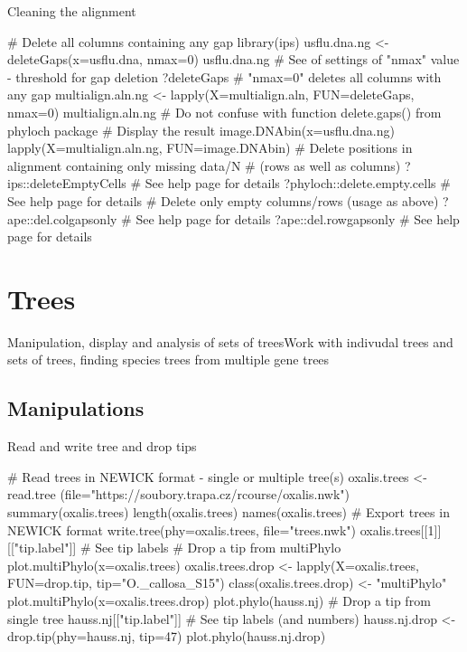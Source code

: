 \documentclass[compress, ucs, xelatex, 11pt, xcolor=svgnames,
  hyperref={
    bookmarks=true,
    unicode=true,
    colorlinks=true,
    pdftitle={Molecular data in R},
    plainpages=false,
    pdfauthor={Vojtech Zeisek},
    pdfsubject={Course about phylogeny and evolution in R},
    pdfcreator={XeLaTeX},
    pdfkeywords={R, evolution, phylogeny, molecular data},
    linkcolor=Tomato,
    anchorcolor=SaddleBrown,
    citecolor=Goldenrod,
    filecolor=DarkMagenta,
    menucolor=Sienna,
    urlcolor=DarkTurquoise,
    pdftex},
  url={hyphens, lowtilde} %
  ]{beamer}
\begin{document}
\begin{frame}[fragile]{Cleaning the alignment}
  \begin{spluscode}
    # Delete all columns containing any gap
    library(ips)
    usflu.dna.ng <- deleteGaps(x=usflu.dna, nmax=0)
    usflu.dna.ng
    # See of settings of "nmax" value - threshold for gap deletion
    ?deleteGaps # "nmax=0" deletes all columns with any gap
    multialign.aln.ng <- lapply(X=multialign.aln, FUN=deleteGaps, nmax=0)
    multialign.aln.ng
    # Do not confuse with function delete.gaps() from phyloch package
    # Display the result
    image.DNAbin(x=usflu.dna.ng)
    lapply(X=multialign.aln.ng, FUN=image.DNAbin)
    # Delete positions in alignment containing only missing data/N
    # (rows as well as columns)
    ?ips::deleteEmptyCells # See help page for details
    ?phyloch::delete.empty.cells # See help page for details
    # Delete only empty columns/rows (usage as above)
    ?ape::del.colgapsonly # See help page for details
    ?ape::del.rowgapsonly # See help page for details
  \end{spluscode}
\end{frame}

\section{Trees}

\begin{frame}{Manipulation, display and analysis of sets of trees}{Work with indivudal trees and sets of trees, finding species trees from multiple gene trees}
  \tableofcontents[currentsection, sectionstyle=show/hide, hideothersubsections]
\end{frame}

\subsection{Manipulations}

\begin{frame}[fragile]{Read and write tree and drop tips}
  \begin{spluscode}
    # Read trees in NEWICK format - single or multiple tree(s)
    oxalis.trees <- read.tree
      (file="https://soubory.trapa.cz/rcourse/oxalis.nwk")
    summary(oxalis.trees)
    length(oxalis.trees)
    names(oxalis.trees)
    # Export trees in NEWICK format
    write.tree(phy=oxalis.trees, file="trees.nwk")
    oxalis.trees[[1]][["tip.label"]] # See tip labels
    # Drop a tip from multiPhylo
    plot.multiPhylo(x=oxalis.trees)
    oxalis.trees.drop <- lapply(X=oxalis.trees, FUN=drop.tip,
      tip="O._callosa_S15")
    class(oxalis.trees.drop) <- "multiPhylo"
    plot.multiPhylo(x=oxalis.trees.drop)
    plot.phylo(hauss.nj) # Drop a tip from single tree
    hauss.nj[["tip.label"]] # See tip labels (and numbers)
    hauss.nj.drop <- drop.tip(phy=hauss.nj, tip=47)
    plot.phylo(hauss.nj.drop)
  \end{spluscode}
\end{frame}
\end{document}
